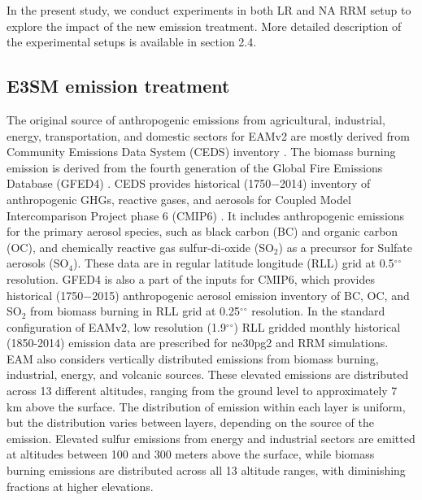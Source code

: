 In the present study, we conduct experiments in both LR and NA RRM setup to explore the impact of the new emission treatment. More detailed description of the experimental setups is available in section 2.4.

\subsection{E3SM emission treatment}

The original source of anthropogenic emissions from agricultural, industrial, energy, transportation, and domestic sectors for EAMv2 are mostly derived from Community Emissions Data System (CEDS) inventory \citep{hoesly2018historical}. The biomass burning emission is derived from the fourth generation of the Global Fire Emissions Database (GFED4) \citep{giglio2013analysis,van2017historic}. CEDS provides historical (1750$-$2014) inventory of anthropogenic GHGs, reactive gases, and aerosols for Coupled Model Intercomparison Project phase 6 (CMIP6) \citep{eyring2016overview}. It includes anthropogenic emissions for the primary aerosol species, such as black carbon (BC) and organic carbon (OC), and chemically reactive gas sulfur-di-oxide (SO$_2$) as a precursor for Sulfate aerosols (SO$_4$). These data are in regular latitude longitude (RLL) grid at {0.5}$^{\circ}$$^{\circ}$ resolution. GFED4 is also a part of the inputs for CMIP6, which provides historical (1750$-$2015) anthropogenic aerosol emission inventory of BC, OC, and SO$_2$ from biomass burning in RLL grid at {0.25}$^{\circ}$$^{\circ}$ resolution. In the standard configuration of EAMv2, low resolution ({1.9}$^{\circ}$$^{\circ}$) RLL gridded monthly historical (1850-2014) emission data are prescribed for ne30pg2 and RRM simulations. EAM also considers vertically distributed emissions from biomass burning, industrial, energy, and volcanic sources. These elevated emissions are distributed across 13 different altitudes, ranging from the ground level to approximately 7 km above the surface. The distribution of emission within each layer is uniform, but the distribution varies between layers, depending on the source of the emission. Elevated sulfur emissions from energy and industrial sectors are emitted at altitudes between 100 and 300 meters above the surface, while biomass burning emissions are distributed across all 13 altitude ranges, with diminishing fractions at higher elevations.

